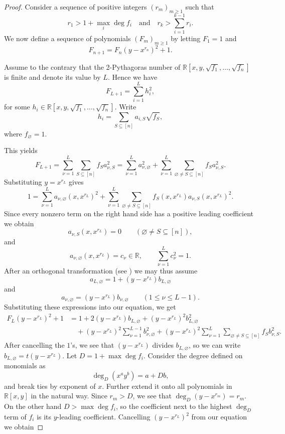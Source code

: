 \documentclass[12pt,reqno]{amsart}   	%
\theoremstyle{remark}
\newcommand{\R}{\mathbb{R}}
\newcommand{\brac}[1]{\left ( #1 \right )}
\begin{document}
\begin{proof}
    Consider a sequence of positive integers $(r_m)_{m\geq1}$ such that
    \[
    r_1>1+\max_i \deg f_i\quad \text{and} \quad r_k>\sum_{i=1}^{k-1} r_i. 
    \]
    We now define a sequence of polynomials $(F_m)_{m\geq 1}$ by letting $F_1=1$ and
    \[
    F_{n+1} = F_n\brac{y-x^{r_n}}^2+1.
    \]

    Assume to the contrary that the 2-Pythagoras number of $\R[x,y,\sqrt{f_1},\dots, \sqrt{f_n}]$ is finite and denote its value by $L$. Hence we have
    \[
    F_{L+1} = \sum_{i=1}^L h_i^2,
    \]
    for some $h_i\in \R[x,y,\sqrt{f_1},\dots, \sqrt{f_n}]$. Write
    \[
    h_i=\sum_{S\subseteq[n]}a_{i,S}\sqrt{f_S},
    \]
where $f_\varnothing = 1$.
    
    This yields
    \[
    F_{L+1} = \sum_{\nu=1}^L \sum_{S\subseteq[n]}f_Sa_{\nu,S}^2 = \sum_{\nu=1}^L a_{\nu,\varnothing}^2
        +
        \sum_{\nu=1}^L
        \sum_{\varnothing\neq S\subseteq[n]}
        f_Sa_{\nu,S}^2 .
    \]
    Substituting $y=x^{r_L}$ gives
    \[
     1 =\sum_{\nu=1}^L a_{\nu,\varnothing}(x,x^{r_L})^2 + \sum_{\nu=1}^L \sum_{\varnothing\neq S\subseteq[n]} f_S(x,x^{r_L}) a_{\nu,S}(x,x^{r_L})^2 .
    \]
    Since every nonzero term on the right hand side has a positive leading coefficient we obtain
    \[
        a_{\nu,S}(x,x^{r_L})=0 \qquad(\varnothing\neq S\subseteq[n]),
    \]
    and
    \[
            a_{\nu,\varnothing}(x,x^{r_L})=c_\nu\in\mathbb R,\qquad \sum_{\nu=1}^L c_\nu^2 =1 .
    \]
    After an orthogonal transformation (see \cite[Theorem 8.1.2]{pd2001}) we may thus assume
    \[
        a_{L,\varnothing}=1+(y-x^{r_L}) b_{L,\varnothing}
    \]
    and
    \[
        a_{\nu,\varnothing}=(y-x^{r_L}) b_{\nu,\varnothing} \qquad(1\leq \nu\leq L-1).
    \]
    Substituting these expressions into our equation, we get
    \[
    \begin{aligned}
            F_L(y-x^{r_L})^2+1
            &=
            1 + 2(y-x^{r_L}) b_{L,\varnothing} + (y-x^{r_L})^2 b_{L,\varnothing}^2     \\
            & \quad
            +(y-x^{r_L})^2\sum_{\nu=1}^{L-1} b_{\nu,\varnothing}^2+(y-x^{r_L})^2\sum_{\nu=1}^L \sum_{\varnothing\neq S\subseteq[n]} f_Sb_{\nu,S}^2 .
    \end{aligned}
    \]
    After cancelling the $1$'s, we see that $(y-x^{r_L})$ divides $b_{L, \varnothing}$, so we can write $b_{L, \varnothing} = t(y-x^{r_L})$. Let $D = 1+\max\deg f_i$. Consider the degree defined on monomials as
    \[
    \deg_D(x^ay^b) = a+Db,
    \]
    and break ties by exponent of $x$. Further extend it onto all polynomials in $\R[x,y]$ in the natural way. Since $r_m>D$, we see that \allowbreak\mbox{${\deg_D(y-x^{r_m}) = r_m}$}. On the other hand $D>\max\deg f_i$, so the coefficient next to the highest $\deg_D$ term of $f_i$ is its $y$-leading coefficient. Cancelling $(y-x^{r_L})^2$ from our equation we obtain

\end{proof}
\end{document}
